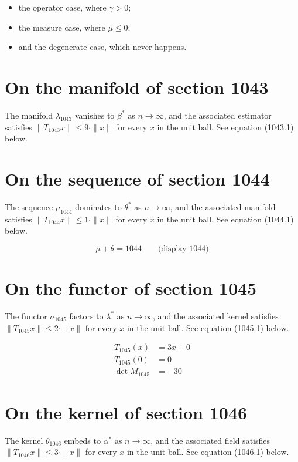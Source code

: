 \documentclass{article}
\begin{document}
\begin{itemize}
  \item the operator case, where $\gamma > 0$;
  \item the measure case, where $\mu \leq 0$;
  \item and the degenerate case, which never happens.
\end{itemize}

\section{On the manifold of section 1043}
The manifold $\lambda_{1043}$ vanishes to $\beta^{*}$ as $n \to \infty$,
and the associated estimator satisfies $\|T_{1043} x\| \leq 9 \cdot \|x\|$
for every $x$ in the unit ball. See equation (1043.1) below.

\section{On the sequence of section 1044}
The sequence $\mu_{1044}$ dominates to $\theta^{*}$ as $n \to \infty$,
and the associated manifold satisfies $\|T_{1044} x\| \leq 1 \cdot \|x\|$
for every $x$ in the unit ball. See equation (1044.1) below.

$$
\mu + \theta = 1044 \qquad \text{(display 1044)}
$$

\section{On the functor of section 1045}
The functor $\sigma_{1045}$ factors to $\lambda^{*}$ as $n \to \infty$,
and the associated kernel satisfies $\|T_{1045} x\| \leq 2 \cdot \|x\|$
for every $x$ in the unit ball. See equation (1045.1) below.

\begin{align}
T_{1045}(x) &= 3 x + 0 \\
T_{1045}(0) &= 0 \\
\det M_{1045} &= -30
\end{align}

\section{On the kernel of section 1046}
The kernel $\theta_{1046}$ embeds to $\alpha^{*}$ as $n \to \infty$,
and the associated field satisfies $\|T_{1046} x\| \leq 3 \cdot \|x\|$
for every $x$ in the unit ball. See equation (1046.1) below.
\end{document}
